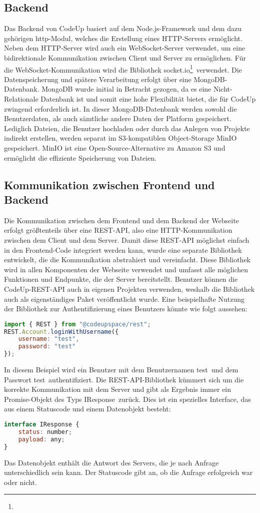 \documentclass[main.tex]{subfiles}
\begin{document}
    \subsection{Backend}
    Das Backend von CodeUp basiert auf dem Node.js-Framework und dem dazu gehörigen \dq http\dq-Modul, welches die Erstellung eines HTTP-Servers ermöglicht.
    Neben dem HTTP-Server wird auch ein WebSocket-Server verwendet, um eine bidirektionale Kommunikation zwischen Client und Server zu ermöglichen.
    Für die WebSocket-Kommunikation wird die Bibliothek \dq socket.io\dq \footnote{}\ verwendet.
    Die Datenspeicherung und spätere Verarbeitung erfolgt über eine MongoDB-Datenbank.
    MongoDB wurde initial in Betracht gezogen, da es eine Nicht-Relationale Datenbank ist und somit eine hohe Flexibilität bietet, die für CodeUp zwingend erforderlich ist.
    In dieser MongoDB-Datenbank werden sowohl die Benutzerdaten, als auch sämtliche andere Daten der Platform gespeichert.
    Lediglich Dateien, die Benutzer hochladen oder durch das Anlegen von Projekte indirekt erstellen, werden separat im S3-kompatiblen Object-Storage MinIO gespeichert.
    MinIO ist eine Open-Source-Alternative zu Amazon S3 und ermöglicht die effiziente Speicherung von Dateien.

    \subsection{Kommunikation zwischen Frontend und Backend}
    Die Kommunikation zwischen dem Frontend und dem Backend der Webseite erfolgt größtenteils über eine REST-API, also eine HTTP-Kommunikation zwischen dem Client und dem Server.
    Damit diese REST-API möglichst einfach in den Frontend-Code integriert werden kann, wurde eine separate Bibliothek entwickelt, die die Kommunikation abstrahiert und vereinfacht.
    Diese Bibliothek wird in allen Komponenten der Webseite verwendet und umfasst alle möglichen Funktionen und Endpunkte, die der Server bereitstellt.
    Benutzer können die CodeUp-REST-API auch in eigenen Projekten verwenden, weshalb die Bibliothek auch als eigenständiges Paket veröffentlicht wurde.
    Eine beispielhafte Nutzung der Bibliothek zur Authentifizierung eines Benutzers könnte wie folgt aussehen:
    \begin{lstlisting}[language=javascript]
import { REST } from "@codeupspace/rest";
REST.Account.loginWithUsername({
    username: "test",
    password: "test"
});
    \end{lstlisting}
    In diesem Beispiel wird ein Benutzer mit dem Benutzernamen \dq test\dq \ und dem Passwort \dq test\dq \ authentifiziert.
    Die REST-API-Bibliothek kümmert sich um die korrekte Kommunikation mit dem Server und gibt als Ergebnis immer ein Promise-Objekt des Typs \dq IResponse\dq\ zurück.
    Dies ist ein spezielles Interface, das aus einem Statuscode und einem Datenobjekt besteht:
    \begin{lstlisting}[language=javascript]
interface IResponse {
    status: number;
    payload: any;
}
    \end{lstlisting}
    Das Datenobjekt enthält die Antwort des Servers, die je nach Anfrage unterschiedlich sein kann.
    Der Statuscode gibt an, ob die Anfrage erfolgreich war oder nicht.
\end{document}
